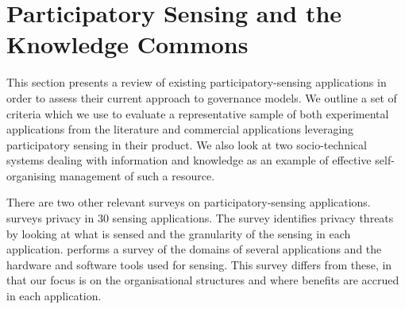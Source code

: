 













\section{Participatory Sensing and the Knowledge Commons}\label{sec:review}

This section presents a review of existing participatory-sensing applications in order to assess their current approach to governance models.  
We outline a set of criteria which we use to evaluate a representative sample of both experimental applications from the literature and commercial applications leveraging participatory sensing in their product. 
We also look at two socio-technical systems dealing with information and knowledge as an example of effective self-organising management of such a resource.

There are two other relevant surveys on participatory-sensing applications. 
 surveys privacy in 30 sensing applications. The survey identifies privacy threats by looking at what is sensed and the granularity of the sensing in each application. 
 performs a survey of the domains of several applications and the hardware and software tools used for sensing. 
This survey differs from these, in that our focus is on the organisational structures and where benefits are accrued in each application.

